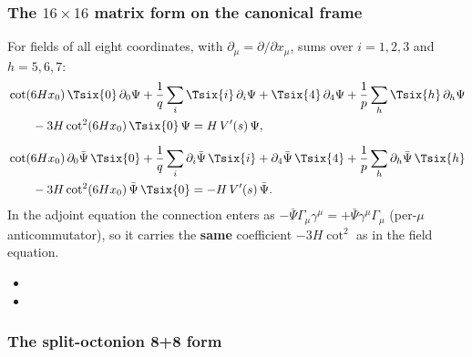 \subsubsection{The \texorpdfstring{$16\times16$}{16x16} matrix form on the canonical frame}
\label{sec:3.4.2}

For fields of all eight coordinates, with $\partial_\mu=\partial/\partial x_\mu$, sums over $i=1,2,3$
and $h=5,6,7$:
\begin{align*}
  &\cot(6Hx_0)\,\Tsix{0}\,\partial_0\Psi+\frac1q\sum_i\Tsix{i}\,\partial_i\Psi+\Tsix{4}\,\partial_4\Psi
  +\frac1p\sum_h\Tsix{h}\,\partial_h\Psi\\
  &\qquad-3H\cot^2(6Hx_0)\,\Tsix{0}\,\Psi=H\,V'(s)\,\Psi,\\[6pt]
  &\cot(6Hx_0)\,\partial_0\bar\Psi\,\Tsix{0}+\frac1q\sum_i\partial_i\bar\Psi\,\Tsix{i}+\partial_4\bar\Psi\,\Tsix{4}
  +\frac1p\sum_h\partial_h\bar\Psi\,\Tsix{h}\\
  &\qquad-3H\cot^2(6Hx_0)\,\bar\Psi\,\Tsix{0}=-H\,V'(s)\,\bar\Psi .
\end{align*}
In the adjoint equation the connection enters as
$-\bar\Psi\Gamma_\mu\gamma^\mu=+\bar\Psi\gamma^\mu\Gamma_\mu$ (per-$\mu$ anticommutator), so it carries
the \textbf{same} coefficient $-3H\cot^2$ as in the field equation. 
\begin{itemize}
  \item {}
  \item {}
\end{itemize}

\subsubsection{The split-octonion 8+8 form}
\label{sec:3.4.3}

